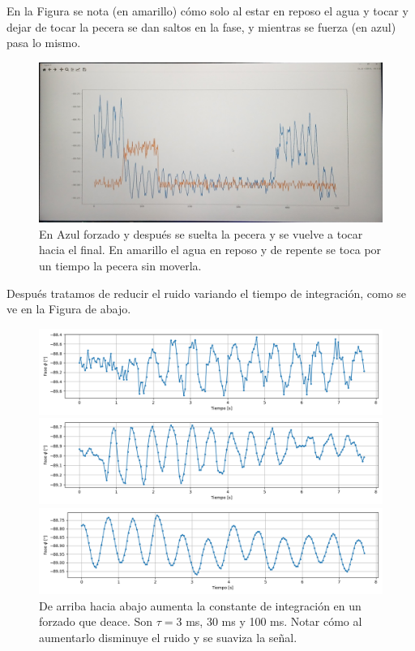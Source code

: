 En la Figura se nota (en amarillo) cómo solo al estar en reposo el agua y tocar y dejar de tocar la pecera se dan saltos en la fase, y mientras se fuerza (en azul) pasa lo mismo. 

\begin{figure}[!ht]
	\centering
	\includegraphics[width=0.957\linewidth]{Figures/19_05_2025/Saltos_de_fase_al_tocar}
	\caption{En Azul forzado y después se suelta la pecera y se vuelve a tocar hacia el final. En amarillo el agua en reposo y de repente se toca por un tiempo la pecera sin moverla.}
	\label{fig:saltosdefasealtocar}
\end{figure}

Después tratamos de reducir el ruido variando el tiempo de integración, como se ve en la Figura de abajo. 

\begin{figure}[!ht]
	\centering
	\includegraphics[width=0.8597\linewidth]{Figures/19_05_2025/3ms}
	
	\includegraphics[width=0.8597\linewidth]{Figures/19_05_2025/30ms}
	
	\includegraphics[width=0.8597\linewidth]{Figures/19_05_2025/100ms_24dB}
	\caption{De arriba hacia abajo aumenta la constante de integración en un forzado que deace. Son $\tau=3$ ms, 30 ms y 100 ms. Notar cómo al aumentarlo disminuye el ruido y se suaviza la señal.}
	\label{fig:taus_variables}
\end{figure}


